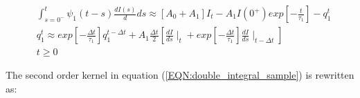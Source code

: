 \begin{equation}
\begin{aligned}
& \int_{s=0^{-}}^{t}  \psi_1(t-s) \frac{dI(s)}{d}ds \approx 
\left[ A_0+A_1 \right] I_t -A_1 I(0^+) exp \left[- \frac{t}{\tau_1} \right] -q^t_1\\
& q^t_1 \approx exp \left[- \frac{\Delta t}{\tau_1} \right] q^{t-\Delta t}_1 +A_1 \frac{\Delta t}{2} 
\left[ \frac{dI}{ds} \mid_t + exp \left[ - \frac{\Delta t}{\tau_1} \right]  \frac{dI}{ds} \mid_{t-\Delta t} \right]  \\
& t \geq 0 
\end{aligned}
\label{EQN_2.23:double_integral_expand}
\end{equation}

The second order kernel in equation (\ref{EQN:double_integral_sample}) is rewritten as:

